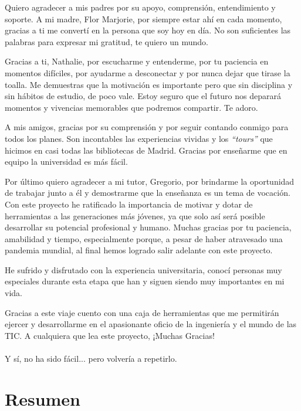 \documentclass[a4paper, 12pt]{book}
\begin{document}
Quiero agradecer a mis padres por su apoyo, comprensión, entendimiento y soporte. A mi madre, Flor Marjorie, por siempre estar ahí en cada momento, gracias a ti me convertí en la persona que soy hoy en día. No son suficientes las palabras para expresar mi gratitud, te quiero un mundo. 

Gracias a ti, Nathalie, por escucharme y entenderme, por tu paciencia en momentos difíciles, por ayudarme a desconectar y por nunca dejar que tirase la toalla. Me demuestras que la motivación es importante pero que sin disciplina y sin hábitos de estudio, de poco vale. Estoy seguro que el futuro nos deparará momentos y vivencias memorables que podremos compartir. Te adoro.

A mis amigos, gracias por su comprensión y por seguir contando conmigo para todos los planes. Son incontables las experiencias vividas y los \textit{``tours''} que hicimos en casi todas las bibliotecas de Madrid. Gracias por enseñarme que en equipo la universidad es más fácil.

Por último quiero agradecer a mi tutor, Gregorio, por brindarme la oportunidad de trabajar junto a él y demostrarme que la enseñanza es un tema de vocación. Con este proyecto he ratificado la importancia de motivar y dotar de herramientas a las generaciones más jóvenes, ya que solo así será posible desarrollar su potencial profesional y humano. Muchas gracias por tu paciencia, amabilidad y tiempo, especialmente porque, a pesar de haber atravesado una pandemia mundial, al final hemos logrado salir adelante con este proyecto.

He sufrido y disfrutado con la experiencia universitaria, conocí personas muy especiales durante esta etapa que han y siguen siendo muy importantes en mi vida. 

Gracias a este viaje cuento con una caja de herramientas que me permitirán ejercer y desarrollarme en el apasionante oficio de la ingeniería y el mundo de las TIC.
A cualquiera que lea este proyecto, ¡Muchas Gracias!
\\\\
Y sí, no ha sido fácil... pero volvería a repetirlo.\\

\chapter*{Resumen}
\end{document}
